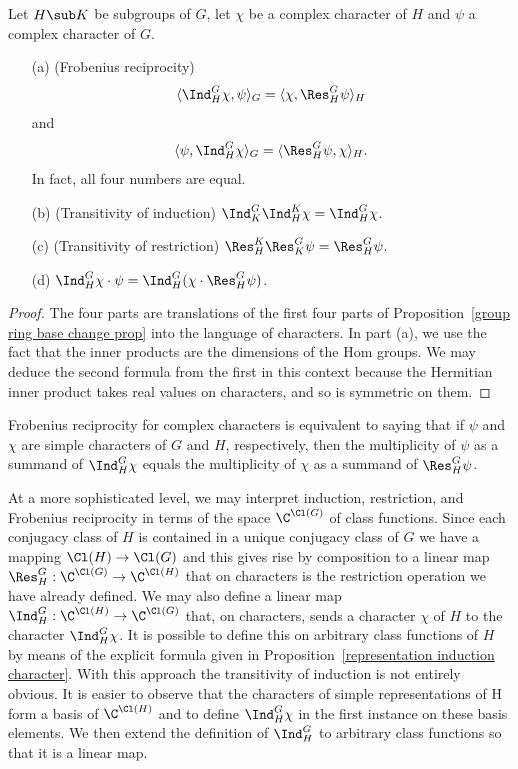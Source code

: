 \begin{corollary}\label{character base change prop}
Let $H\sub K$ be subgroups of $G$, let $\chi$ be a complex character of $H$ and $\psi$ a complex character of $G$.
\begin{itemize}
\item[(a)] (Frobenius reciprocity)
\[\langle\Ind^G_H\chi,\psi\rangle_G=\langle\chi,\Res^G_H\psi\rangle_H\]
and
\[\langle\psi,\Ind^G_H\chi\rangle_G=\langle\Res^G_H\psi,\chi\rangle_H.\]
In fact, all four numbers are equal.
\item[(b)] (Transitivity of induction) $\Ind^G_K\Ind^K_H\chi=\Ind^G_H\chi$.
\item[(c)] (Transitivity of restriction) $\Res^K_H\Res^G_K\psi=\Res^G_H\psi$.
\item[(d)] $\Ind^G_H\chi\cdot\psi=\Ind^G_H(\chi\cdot\Res^G_H\psi)$. 
\end{itemize}
\end{corollary}
\begin{proof}
The four parts are translations of the first four parts of Proposition~\ref{group ring base change prop} into the language of characters. In part (a), we use the fact that the inner products are the dimensions of the Hom groups. We may deduce the second formula from the first in this context because the Hermitian inner product takes real values on characters, and so is symmetric on them.
\end{proof}
Frobenius reciprocity for complex characters is equivalent to saying that if $\psi$ and $\chi$ are simple characters of $G$ and $H$, respectively, then the multiplicity of $\psi$ as a summand of $\Ind^G_H\chi$ equals the multiplicity of $\chi$ as a summand of $\Res^G_H\psi$.\par
At a more sophisticated level, we may interpret induction, restriction, and Frobenius reciprocity in terms of the space $\C^{\Cl(G)}$ of class functions. Since each conjugacy class of $H$ is contained in a unique conjugacy class of $G$ we have a mapping $\Cl(H)\to\Cl(G)$ and this
gives rise by composition to a linear map $\Res^G_H:\C^{\Cl(G)}\to\C^{\Cl(H)}$ that on characters is the restriction operation we have already defined. We may also define a linear map $\Ind^G_H:\C^{\Cl(H)}\to\C^{\Cl(G)}$ that, on characters, sends a character $\chi$ of $H$ to the character $\Ind^G_H\chi$. It is possible to define this on arbitrary class functions of $H$ by means of the explicit formula given in Proposition~\ref{representation induction character}. With this approach the transitivity of induction is not entirely obvious. It is easier to observe that the characters of simple representations of H form a basis of $\C^{\Cl(H)}$ and to define $\Ind^G_H\chi$ in the first instance on these basis elements. We then extend the definition of $\Ind^G_H$ to arbitrary class functions so that it is a linear map.\par
